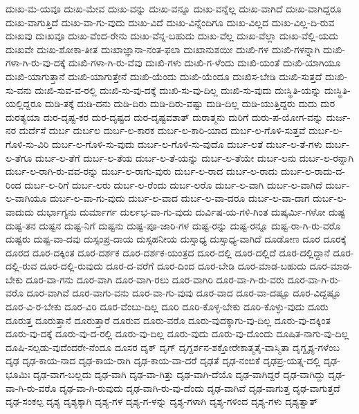 {ದುಃಖ-ಮ-ಯವೂ
ದುಃಖ-ಮೇವ
ದುಃಖ-ವನ್ನು
ದುಃಖ-ವನ್ನೂ
ದುಃಖ-ವನ್ನೆಲ್ಲ
ದುಃಖ-ವಾಗಿದೆ
ದುಃಖ-ವಾಗಿದ್ದರೂ
ದುಃಖ-ವಾಗುತ್ತಿದೆ
ದುಃಖ-ವಾ-ಗು-ವುದು
ದುಃಖ-ವಿದೆ
ದುಃಖ-ವಿನ್ನೆಂದಿಗೂ
ದುಃಖ-ವಿಲ್ಲದ
ದುಃಖ-ವಿಲ್ಲ-ದಿ-ರುವ
ದುಃಖವು
ದುಃಖವೂ
ದುಃಖ-ವೆಂದ-ರೇನು
ದುಃಖ-ವೆನ್ನ-ಬಹುದು
ದುಃಖ-ವೆಲ್ಲ
ದುಃಖ-ವೆಲ್ಲಾ
ದುಃಖ-ವೆಲ್ಲಿ-ಯದು
ದುಃಖವೇ
ದುಃಖ-ಶೋಕಾ-ತೀತ
ದುಃಖಾಜ್ಞಾನಾ-ನಂತ-ಫಲಾ
ದುಃಖಾನುಶಯೀ
ದುಃಖಿ-ಗಳ
ದುಃಖಿ-ಗಳನ್ನಾಗಿ
ದುಃಖಿ-ಗಳಾ-ಗಿ-ರು-ವು-ದಕ್ಕೆ
ದುಃಖಿ-ಗಳಾ-ಗಿ-ರು-ವೆವು
ದುಃಖಿ-ಗಳು
ದುಃಖಿ-ಗ-ಳೆಂದು
ದುಃಖಿ-ಯಂತೆ
ದುಃಖಿ-ಯಾಗಿಯೂ
ದುಃಖಿ-ಯಾಗುತ್ತಾನೆ
ದುಃಖಿ-ಯಾಗುತ್ತೇನೆ
ದುಃಖಿ-ಯೆಂದು
ದುಃಖಿ-ಯೆಂದೂ
ದುಃಖಿಸ-ಬೇಡಿ
ದುಃಖಿ-ಸುತ್ತದೆ
ದುಃಖಿ-ಸು-ವನು
ದುಃಖಿ-ಸುವ-ವ-ರಲ್ಲಿ
ದುಃಖಿ-ಸು-ವು-ದಕ್ಕೆ
ದುಃಖಿ-ಸು-ವು-ದಿಲ್ಲ
ದುಃಖಿ-ಸು-ವುದು
ದುಃಸ್ಥಿತಿ-ಯನ್ನು
ದುಃಸ್ಥಿತಿ-ಯಲ್ಲಿದ್ದರೂ
ದುಡಿ-ತಕ್ಕೆ
ದುಡಿ-ದನು
ದುಡಿ-ದಿರು
ದುಡಿ-ದಿರು-ವಷ್ಟು
ದುಡಿ-ದಿಲ್ಲ
ದುಡಿ-ಯುತ್ತಿದ್ದರು
ದುದು
ದುರ
ದುರತ್ಯಯಾ
ದುರ-ದೃಷ್ಟ-ಕರ
ದುರ-ದೃಷ್ಟದ
ದುರ-ದೃಷ್ಟವಶಾತ್
ದುರಾತ್ಮನು
ದುರಿಗೆ
ದುರು-ಪ-ಯೋಗ-ವನ್ನು
ದುರ್ಜ-ನರ
ದುರ್ದೆಸೆ
ದುರ್ಬ
ದುರ್ಬಲ
ದುರ್ಬ-ಲ-ಕಾರಕ
ದುರ್ಬ-ಲ-ಕಾರಿ-ಯಾದ
ದುರ್ಬ-ಲ-ಗೊಳಿ-ಸುತ್ತವೆ
ದುರ್ಬ-ಲ-ಗೊಳಿ-ಸು-ವಿರಿ
ದುರ್ಬ-ಲ-ಗೊಳಿ-ಸು-ವುದು
ದುರ್ಬ-ಲ-ಗೊಳಿ-ಸು-ವುದೊ
ದುರ್ಬ-ಲತೆ
ದುರ್ಬ-ಲ-ತೆ-ಗಳು
ದುರ್ಬ-ಲ-ತೆಗೂ
ದುರ್ಬ-ಲ-ತೆಗೆ
ದುರ್ಬ-ಲ-ತೆಯ
ದುರ್ಬ-ಲ-ತೆ-ಯನ್ನು
ದುರ್ಬ-ಲ-ತೆಯೇ
ದುರ್ಬ-ಲನು
ದುರ್ಬ-ಲ-ರನ್ನಾಗಿ
ದುರ್ಬ-ಲ-ರಾಗಿ-ರು-ವವ-ರನ್ನು
ದುರ್ಬ-ಲ-ರಾಗು-ವುರು
ದುರ್ಬ-ಲ-ರಾದ
ದುರ್ಬ-ಲ-ರಾದು
ದುರ್ಬ-ಲ-ರಾದು-ದ-ರಿಂದ
ದುರ್ಬ-ಲ-ರಿಗೆ
ದುರ್ಬ-ಲರು
ದುರ್ಬ-ಲ-ರೆಂದು
ದುರ್ಬ-ಲರೊ
ದುರ್ಬ-ಲ-ವಾಗಿ
ದುರ್ಬ-ಲ-ವಾಗಿದೆ
ದುರ್ಬ-ಲ-ವಾಗಿಯೂ
ದುರ್ಬ-ಲ-ವಾ-ಗು-ವುದು
ದುರ್ಬ-ಲ-ವಾದ
ದುರ್ಬ-ಲ-ವಾ-ದರೂ
ದುರ್ಬ-ಲ-ವಾ-ದಾಗ
ದುರ್ಬ-ಲ-ವಾದುದು
ದುರ್ಭಾಗ್ಯನು
ದುರ್ಮಾರ್ಗ
ದುರ್ಲಭ-ವಾ-ಗು-ವುದು
ದುರ್ವಿಷ-ಯ-ಗಳಿ-ಗಿಂತ
ದುಷ್ಕರ್ಮಿ-ಗಳೋ
ದುಷ್ಟ
ದುಷ್ಟ-ತನ
ದುಷ್ಟನ
ದುಷ್ಟ-ನಿಗೆ
ದುಷ್ಟನು
ದುಷ್ಟ-ಪೂ-ಜಾರಿ-ಗಳ
ದುಷ್ಟ-ರನ್ನು
ದುಷ್ಟ-ರನ್ನೂ
ದುಷ್ಟ-ರಾ-ಗಿ-ರು-ವರೊ
ದುಷ್ಟರು
ದುಷ್ಟ-ವಾ-ದವು
ದುಸ್ಸಂಪ್ರ-ದಾಯ
ದುಸ್ಸಹನೀಯ
ದುಸ್ಸಾಧ್ಯ
ದುಸ್ಸಾಧ್ಯ-ವಾಗಿದೆ
ದೂಡೋಣ
ದೂರ
ದೂರಕ್ಕೆ
ದೂರದ
ದೂರ-ದಕ್ಕಿಂತ
ದೂರ-ದರ್ಶಕ
ದೂರ-ದರ್ಶಕ-ಯಂತ್ರದ
ದೂರ-ದಲ್ಲಿ
ದೂರ-ದಲ್ಲಿದೆ
ದೂರ-ದಲ್ಲಿದ್ದಾನೆ
ದೂರ-ದಲ್ಲಿ-ರುವ
ದೂರ-ದಲ್ಲಿ-ರುವುದು
ದೂರ-ದ-ವರೆಗೆ
ದೂರ-ದಿಂದ
ದೂರ-ಬೇಡಿ
ದೂರ-ಮಾಡ-ಬಹುದು
ದೂರ-ಮಾಡ-ಬೇಕು
ದೂರ-ವಾ-ಗನು
ದೂರ-ವಾಗಿ
ದೂರ-ವಾಗಿ-ರಲು
ದೂರ-ವಾಗಿರಿ
ದೂರ-ವಾ-ಗಿ-ರು-ವರು
ದೂರ-ವಾ-ಗಿ-ರು-ವರೊ
ದೂರ-ವಾಗಿವೆ
ದೂರ-ವಾಗು-ವನು
ದೂರ-ವಾ-ಗು-ವುವು
ದೂರ-ವಾದ
ದೂರ-ವಾ-ದಷ್ಟೂ
ದೂರ-ವಿದ್ದಷ್ಟೂ
ದೂರ-ವಿ-ರ-ಬೇಕು
ದೂರ-ವಿರಿ
ದೂರ-ವೆಂಬು-ದಿಲ್ಲ
ದೂರಿ
ದೂರಿ-ಕೊಳ್ಳ-ಬೇಕು
ದೂರಿ-ಕೊಳ್ಳು-ವುದು
ದೂರು
ದೂರುತ್ತ
ದೂರುತ್ತಾನೆ
ದೂರುತ್ತಾರೆ
ದೂರುವ
ದೂರು-ವರೊ
ದೂರು-ವುದಕ್ಕಾಗು-ವು-ದಿಲ್ಲ
ದೂರು-ವು-ದಕ್ಕಿಂತ
ದೂರು-ವು-ದಕ್ಕೆ
ದೂರು-ವು-ದ-ರಲ್ಲಿ
ದೂರು-ವು-ದಿಲ್ಲ
ದೂರು-ವುದು
ದೂರು-ವು-ದೊಂದು
ದೂಷಿತ-ನಾಗು-ವು-ದಿಲ್ಲ
ದೂಷಿ-ಸಲ್ಪಡು-ವುದೆಂದರೇ-ನೆಂದೂ
ದೂಸರ
ದೃಕ್
ದೃಗ್
ದೃಗ್ದರ್ಶನ-ಶಕ್ತೋರೇಕಾತ್ಮತೈ-ವಾಸ್ಮಿತಾ
ದೃಗ್ದೃಶ್ಯ-ಗಳೆಂಬ
ದೃಢ
ದೃಢ-ಕಾಯ-ನಾದ
ದೃಢ-ಕಾಯ-ರಾಗಿ
ದೃಢ-ಕಾಯ-ವಾ-ದರೆ
ದೃಢತೆ
ದೃಢ-ನಂಬಿಕೆ
ದೃಢಪ್ರ-ಯತ್ನ-ದಲ್ಲಿ
ದೃಢ-ಭೂಮಿಃ
ದೃಢ-ವಾಗ-ಬಲ್ಲದು
ದೃಢ-ವಾಗಿ
ದೃಢ-ವಾ-ಗಿತ್ತು
ದೃಢ-ವಾಗಿ-ದೆಯೊ
ದೃಢ-ವಾಗಿದ್ದರೆ
ದೃಢ-ವಾಗಿದ್ದು
ದೃಢ-ವಾ-ಗಿ-ರು-ವರೊ
ದೃಢ-ವಾ-ಗಿ-ರುವುದು
ದೃಢ-ವಾಗಿ-ರು-ವು-ದೆಂದು
ದೃಢ-ವಾಗಿವೆ
ದೃಢ-ವಾಗುತ್ತ
ದೃಢ-ವಾಗುತ್ತದೆ
ದೃಢ-ಸಂಕಲ್ಪ
ದೃಶ್ಯ
ದೃಶ್ಯಕ್ಕಾಗಿ
ದೃಶ್ಯ-ಗಳ
ದೃಶ್ಯ-ಗ-ಳನ್ನು
ದೃಶ್ಯ-ಗಳಾಗಿ
ದೃಶ್ಯ-ಗಳಿಂದ
ದೃಶ್ಯ-ಗಳು
ದೃಶ್ಯತ್ವಾತ್
}
